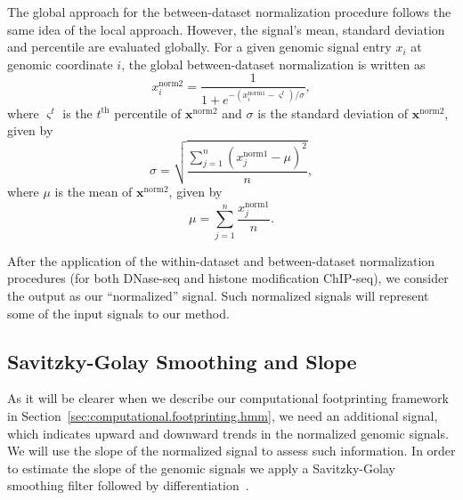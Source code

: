 The global approach for the between-dataset normalization procedure follows the same idea of the local approach. However, the signal's mean, standard deviation and percentile are evaluated globally. For a given genomic signal entry $x_i$ at genomic coordinate $i$, the global between-dataset normalization is written as
\begin{equation}
  \label{eq:signal.between.norm.global}
  {x}^{\text{norm2}}_{i} = \frac{1}{1+e^{{-({x}^{\text{norm1}}_{i}-{\varsigma}^{t})}/{\sigma}}},
\end{equation}
where ${\varsigma}^{t}$ is the $t^{\text{th}}$ percentile of $\mathbf{x}^{\text{norm2}}$ and $\sigma$ is the standard deviation of $\mathbf{x}^{\text{norm2}}$, given by
\begin{equation}
  \label{eq:signal.between.var.global}
  \sigma = \sqrt{ \frac{\sum_{j=1}^{n} \left({x}^{\text{norm1}}_{j} - \mu \right)^2}{ n }},
\end{equation}
where $\mu$ is the mean of $\mathbf{x}^{\text{norm2}}$, given by
\begin{equation}
  \label{eq:signal.between.mean.global}
  \mu = \sum_{j=1}^{n} \frac{{x}^{\text{norm1}}_{j}}{n}.
\end{equation}

After the application of the within-dataset and between-dataset normalization procedures (for both DNase-seq and histone modification ChIP-seq), we consider the output as our ``normalized'' signal. Such normalized signals will represent some of the input signals to our method.

\subsection{Savitzky-Golay Smoothing and Slope}
\label{sec:savitzkygolay.smoothing.slope}

As it will be clearer when we describe our computational footprinting framework in Section~\ref{sec:computational.footprinting.hmm}, we need an additional signal, which indicates upward and downward trends in the normalized genomic signals. We will use the slope of the normalized signal to assess such information. In order to estimate the slope of the genomic signals we apply a Savitzky-Golay smoothing filter followed by differentiation~\cite{madden1978,luo2005}.

